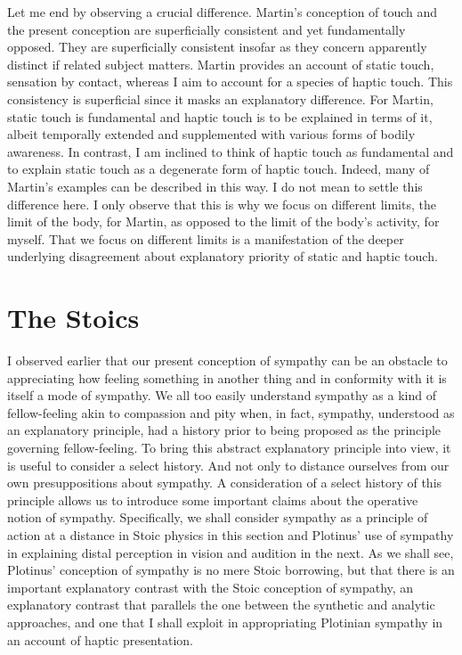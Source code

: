 Let me end by observing a crucial difference. Martin's \citeyearpar{Martin:1992aa} conception of touch and the present conception are superficially consistent and yet fundamentally opposed. They are superficially consistent insofar as they concern apparently distinct if related subject matters. Martin provides an account of static touch, sensation by contact, whereas I aim to account for a species of haptic touch. This consistency is superficial since it masks an explanatory difference. For Martin, static touch is fundamental and haptic touch is to be explained in terms of it, albeit temporally extended and supplemented with various forms of bodily awareness. In contrast, I am inclined to think of haptic touch as fundamental and to explain static touch as a degenerate form of haptic touch. Indeed, many of Martin's examples can be described in this way. I do not mean to settle this difference here. I only observe that this is why we focus on different limits, the limit of the body, for Martin, as opposed to the limit of the body's activity, for myself. That we focus on different limits is a manifestation of the deeper underlying disagreement about explanatory priority of static and haptic touch.



\section{The Stoics} %
\label{sec:the_stoics}

I observed earlier that our present conception of sympathy can be an obstacle to appreciating how feeling something in another thing and in conformity with it is itself a mode of sympathy. We all too easily understand sympathy as a kind of fellow-feeling akin to compassion and pity when, in fact, sympathy, understood as an explanatory principle, had a history prior to being proposed as the principle governing fellow-feeling. To bring this abstract explanatory principle into view, it is useful to consider a select history. And not only to distance ourselves from our own presuppositions about sympathy. A consideration of a select history of this principle allows us to introduce some important claims about the operative notion of sympathy. Specifically, we shall consider sympathy as a principle of action at a distance in Stoic physics in this section and Plotinus' use of sympathy in explaining distal perception in vision and audition in the next. As we shall see, Plotinus' conception of sympathy is no mere Stoic borrowing, but that there is an important explanatory contrast with the Stoic conception of sympathy, an explanatory contrast that parallels the one between the synthetic and analytic approaches, and one that I shall exploit in appropriating Plotinian sympathy in an account of haptic presentation.

